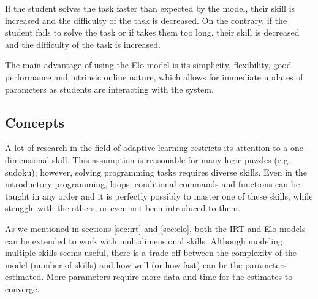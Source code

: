 If the student solves the task faster than expected by the model,
  their skill is increased and the difficulty of the task is decreased.
On the contrary, if the student fails to solve the task or if takes them too long,
  their skill is decreased and the difficulty of the task is increased.


The main advantage of using the Elo model is its simplicity, flexibility,
  good performance and intrinsic online nature, which allows for immediate
  updates of parameters as students are interacting with the system.



\subsection{Concepts}


A lot of research in the field of adaptive learning
  restricts its attention to a one-dimensional skill.
This assumption is reasonable for many logic puzzles (e.g. sudoku);
however, solving programming tasks requires diverse skills.
Even in the introductory programming, loops, conditional commands and functions
  can be taught in any order
  and it is perfectly possibly to master one of these skills,
  while struggle with the others, or even not been introduced to them.

As we mentioned in sections \ref{sec:irt} and \ref{sec:elo},
  both the IRT and Elo models can be extended to work with multidimensional skills.
Although modeling multiple skills seems useful,
  there is a trade-off between the complexity of the model (number of skills)
  and how well (or how fast) can be the parameters estimated.
More parameters require more data and time for the estimates to converge.


